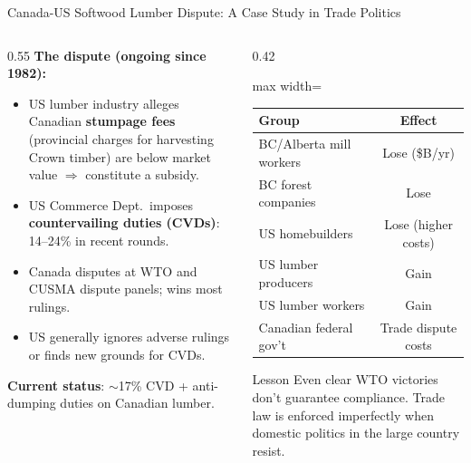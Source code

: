 \documentclass[aspectratio=169]{beamer}
\begin{document}
\begin{frame}{Canada-US Softwood Lumber Dispute: A Case Study in Trade Politics}
\begin{columns}
\begin{column}{0.55\textwidth}
\textbf{The dispute (ongoing since 1982):}
\begin{itemize}
  \item US lumber industry alleges Canadian \textbf{stumpage fees} (provincial charges for harvesting Crown timber) are below market value $\Rightarrow$ constitute a subsidy.
  \item US Commerce Dept.\ imposes \textbf{countervailing duties (CVDs)}: 14--24\% in recent rounds.
  \item Canada disputes at WTO and CUSMA dispute panels; wins most rulings.
  \item US generally ignores adverse rulings or finds new grounds for CVDs.
\end{itemize}
\vspace{0.3em}
\textbf{Current status}: $\sim$17\% CVD + anti-dumping duties on Canadian lumber.
\end{column}
\begin{column}{0.42\textwidth}
\begin{adjustbox}{max width=\columnwidth}
\begin{tabular}{lc}
\toprule
\textbf{Group} & \textbf{Effect}\\
\midrule
BC/Alberta mill workers & Lose (\$B/yr)\\
BC forest companies & Lose\\
US homebuilders & Lose (higher costs)\\
US lumber producers & Gain\\
US lumber workers & Gain\\
Canadian federal gov't & Trade dispute costs\\
\bottomrule
\end{tabular}
\end{adjustbox}
\begin{insight}{Lesson}
  Even clear WTO victories don't guarantee compliance. Trade law is enforced imperfectly when domestic politics in the large country resist.
\end{insight}
\end{column}
\end{columns}
\end{frame}
\end{document}
